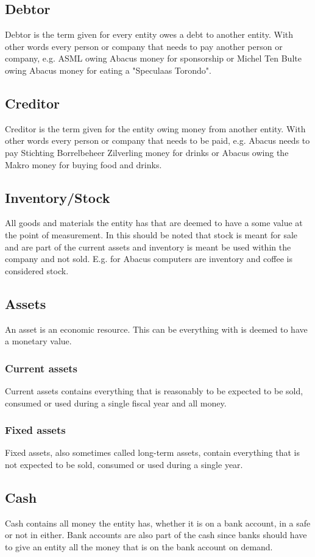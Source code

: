 \documentclass{report}
\begin{document}
\subsection{Debtor}
Debtor is the term given for every entity owes a debt to another entity. With other words every person or company that needs to pay another person or company, e.g. ASML owing Abacus money for sponsorship or Michel Ten Bulte owing Abacus money for eating a "Speculaas Torondo". 
\subsection{Creditor}
Creditor is the term given for the entity owing money from another entity. With other words every person or company that needs to be paid, e.g. Abacus needs to pay Stichting Borrelbeheer Zilverling money for drinks or Abacus owing the Makro money for buying food and drinks. 
\subsection{Inventory/Stock}
All goods and materials the entity has that are deemed to have a some value at the point of measurement. In this should be noted that stock is meant for sale and are part of the current assets and inventory is meant be used within the company and not sold. E.g. for Abacus computers are inventory and coffee is considered stock. 
\subsection{Assets}
An asset is an economic resource. This can be everything with is deemed to have a monetary value. 
\subsubsection{Current assets}
Current assets contains everything that is reasonably to be expected to be sold, consumed or used during a single fiscal year and all money.   
\subsubsection{Fixed assets}
Fixed assets, also sometimes called long-term assets, contain everything that is not expected to be sold, consumed or used during a single year. 
\subsection{Cash}
Cash contains all money the entity has, whether it is on a bank account, in a safe or not in either. Bank accounts are also part of the cash since banks should have to give an entity all the money that is on the bank account on demand. 
\end{document}
